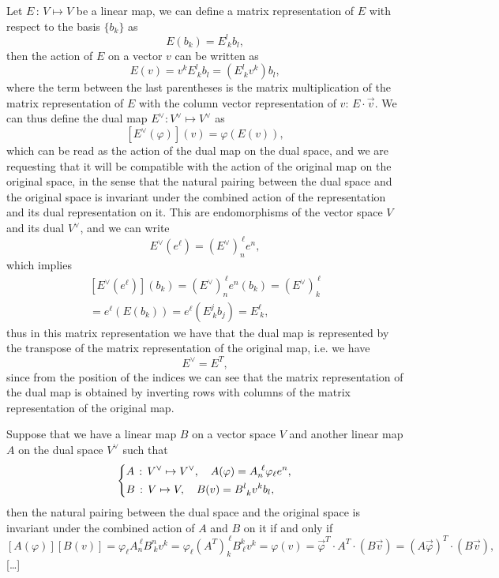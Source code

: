 \begin{definition}
    Let \(E \, : \, V \mapsto V\) be a linear map, we can define a matrix representation of \(E\) with respect to the basis \(\{b_k\}\) as
    \[
        E(b_k) = E^{l}_{\ k} b_l,
    \]
    then the action of \(E\) on a vector \(v\) can be written as
    \[
        E(v) = v^k E^l_{\ k} b_l = (E^l_{\ k} v^k) b_l,
    \]
    where the term between the last parentheses is the matrix multiplication of the matrix representation of \(E\) with the column vector representation of \(v\): \(E \cdot \vec{v}\). We can thus define the dual map \(E^{\vee} : V^{\vee} \mapsto V^{\vee}\) as
    \[
        [E^{\vee}(\varphi)](v) = \varphi(E(v)),
    \]
    which can be read as the action of the dual map on the dual space, and we are requesting that it will be compatible with the action of the original map on the original space, in the sense that the natural pairing between the dual space and the original space is invariant under the combined action of the representation and its dual representation on it. This are endomorphisms of the vector space \(V\) and its dual \(V^{\vee}\), and we can write
    \[
        E^{\vee}(e^{\ell}) = (E^{\vee})^{\ \ell}_{n} e^n,
    \]
    which implies
    \[
        \begin{aligned}
            [E^{\vee}(e^{\ell})](b_k) = (E^{\vee})^{\ \ell}_{n} e^n(b_k) = (E^{\vee})^{\ \ell}_{k} \\
            = e^{\ell}(E(b_k)) = e^{\ell}(E^j_{\ k} b_j) = E^{\ell}_{\ k},
        \end{aligned}
    \]
    thus in this matrix representation we have that the dual map is represented by the transpose of the matrix representation of the original map, i.e. we have
    \[
        E^{\vee} = E^T,
    \]
    since from the position of the indices we can see that the matrix representation of the dual map is obtained by inverting rows with columns of the matrix representation of the original map.
\end{definition}

Suppose that we have a linear map \(B\) on a vector space \(V\) and another linear map \(A\) on the dual space \(V^{\vee}\) such that
\[
    \begin{dcases}
        A \,:\, V^{\vee} \mapsto V^{\vee}, \quad A(\varphi) = A^{\ \ell}_{n} \varphi_{\ell} e^n, \\
        B \,:\, V \mapsto V, \quad B(v) = B^l_{\ k} v^k b_l,
    \end{dcases}
\]
then the natural pairing between the dual space and the original space is invariant under the combined action of \(A\) and \(B\) on it if and only if
\[
    [A(\varphi)][B(v)] = \varphi_{\ell} A_n^{\ \ell} B^n_{\ k} v^k = \varphi_{\ell} (A^T)^{\ \ell}_{k} B^k_{\ \ell} v^k = \varphi(v) = \vec{\varphi}^T \cdot A^T \cdot (B \vec{v}) = (A \vec{\varphi})^T \cdot (B\vec{v}),
\]
[\dots ]

